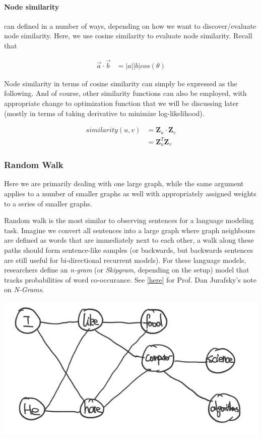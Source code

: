 \paragraph{Node similarity} can defined in a number of ways, depending on how we want to discover/evaluate node similarity. Here, we use cosine similarity to evaluate node similarity. Recall that

\begin{align}
    \vec{a} \cdot \vec{b} &= |a||b|cos(\theta)
\end{align}

Node similarity in terms of cosine similarity can simply be expressed as  the following. And of course, other similarity functions can also be employed, with appropriate change to optimization function that we will be discussing later (mostly in terms of taking derivative to minimize log-likelihood).

\begin{align}
    similarity (u, v) &= \mathbf{Z}_u \cdot \mathbf{Z}_v \\
                      &= \mathbf{Z}_u^T \mathbf{Z}_v
\end{align}{}

\subsubsection{Random Walk}\label{ss_412_rand_walk}

Here we are primarily dealing with one large graph, while the same argument applies to a number of smaller graphs as well with appropriately assigned weights to a series of smaller graphs.

Random walk is the most similar to observing sentences for a language modeling task. Imagine we convert all sentences into a large graph where graph neighbours are defined as words that are immediately next to each other, a walk along these paths should form sentence-like samples (or backwards, but backwards sentences are still useful for bi-directional recurrent models). For these language models, researchers define an \textit{n-gram} (or \textit{Skipgram}, depending on the setup) model that tracks probabilities of word co-occurance. See \href{https://web.stanford.edu/~jurafsky/slp3/3.pdf}{[here]} for Prof. Dan Jurafsky's note on \textit{N-Grams}.

{
\centering
\includegraphics[width=0.65\linewidth]{notes/img/n4_sentences.JPG} \par
}

